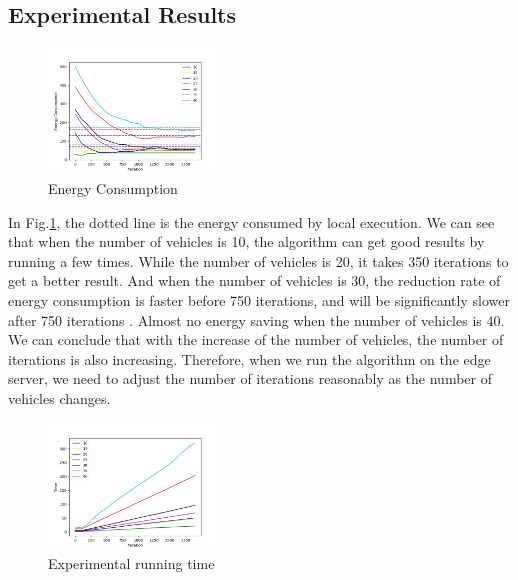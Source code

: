 \documentclass[conference]{IEEEtran}
\begin{document}
\subsection{Experimental Results}
\begin{figure}[htbp]
	\centering
	\includegraphics[width=0.40\textwidth]{energy.png}
	\caption{Energy Consumption}
	\label{energy}
\end{figure}
In Fig.\ref{energy}, the dotted line is the energy consumed by local execution. 
We can see that when the number of vehicles is 10, the algorithm can get good results by running a few times. While the number of vehicles is 20, it takes 350 iterations to get a better result. 
And when the number of vehicles is 30, the reduction rate of energy consumption is faster before 750 iterations, and will be significantly slower after 750 iterations . 
Almost no energy saving when the number of vehicles is 40. 
We can conclude that with the increase of the number of vehicles, the number of iterations is also increasing. 
Therefore, when we run the algorithm on the edge server, we need to adjust the number of iterations reasonably as the number of vehicles changes. 
\begin{figure}[htbp]
	\centering
	\includegraphics[width=0.40\textwidth]{time.png}
	\caption{Experimental running time}
	\label{time}
\end{figure}
\end{document}

